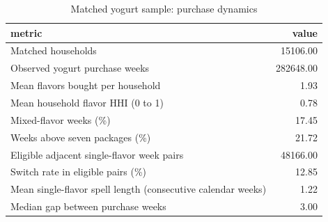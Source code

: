 \begin{table}
\caption{Matched yogurt sample: purchase dynamics}
\begin{tabular}{lr}
\toprule
metric & value \\
\midrule
Matched households & 15106.00 \\
Observed yogurt purchase weeks & 282648.00 \\
Mean flavors bought per household & 1.93 \\
Mean household flavor HHI (0 to 1) & 0.78 \\
Mixed-flavor weeks (\%) & 17.45 \\
Weeks above seven packages (\%) & 21.72 \\
Eligible adjacent single-flavor week pairs & 48166.00 \\
Switch rate in eligible pairs (\%) & 12.85 \\
Mean single-flavor spell length (consecutive calendar weeks) & 1.22 \\
Median gap between purchase weeks & 3.00 \\
\bottomrule
\end{tabular}
\end{table}
